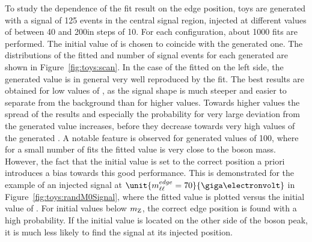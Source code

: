 To study the dependence of the fit result on the edge position, toys are generated with a signal of 125 events in the central signal region, injected at different values of \mlledge between 40 and 200\GeV in steps of 10\GeV. For each configuration, about 1000 fits are performed. The initial value of \mlledge is chosen to coincide with the generated one. The distributions of the fitted \mlledge and number of signal events for each generated \mlledge are shown in Figure~\ref{fig:toys:scan}. In the case of the fitted \mlledge on the left side, the generated value is in general very well reproduced by the fit. The best results are obtained for low values of \mlledge, as the signal shape is much steeper and easier to separate from the background than for higher values. Towards higher values the spread of the results and especially the probability for very large deviation from the generated value increases, before they decrease towards very high values of the generated \mlledge. A notable feature is observed for generated values of 100\GeV, where for a small number of fits the fitted value is very close to the \Z boson mass. However, the fact that the initial value is set to the correct position a priori introduces a bias towards this good performance. This is demonstrated for the example of an injected signal at $\unit{\mlledge = 70}{\giga\electronvolt}$ in Figure~\ref{fig:toys:randM0Signal}, where the fitted value is plotted versus the initial value of \mlledge. For initial values below $m_{\mathrm{Z}}$, the correct edge position is found with a high probability. If the initial value is located on the other side of the \Z boson peak, it is much less likely to find the signal at its injected position. 

